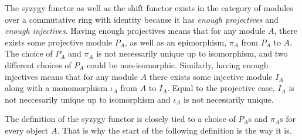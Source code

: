 The syzygy functor as well as the shift functor exists in the category of modules over a commutative ring with identity because it has \emph{enough projectives} and \emph{enough injectives}. Having enough projectives means that for any module \( A \), there exists some projective module \( P_A \), as well as an epimorphism, \( \pi_A \) from \( P_A \) to \( A \). The choice of \( P_A \) and \( \pi_A \) is not necessarily unique up to isomorphism, and two different choices of \( P_A \) could be non-isomorphic. Similarly, having enough injectives means that for any module \( A \) there exists some injective module \( I_A \) along with a monomorphism \( \iota_A \) from \( A \) to \( I_A \). Equal to the projective case, \( I_A \) is not neccesarily unique up to isomorphism and \( \iota_A \) is not necessarily unique.

The definition of the syzygy functor is closely tied to a choice of \( P_A \)s and \( \pi_A \)s for every object \( A \). That is why the start of the following definition is the way it is.

